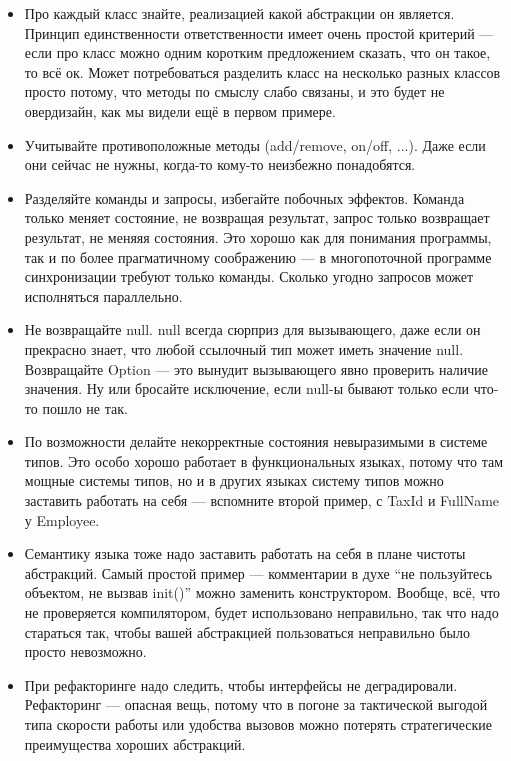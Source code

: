 \documentclass[a5paper]{article}
\begin{document}
\begin{itemize}
	\item Про каждый класс знайте, реализацией какой абстракции он является. Принцип единственности ответственности имеет очень простой критерий --- если про класс можно одним коротким предложением сказать, что он такое, то всё ок. Может потребоваться разделить класс на несколько разных классов просто потому, что методы по смыслу слабо связаны, и это будет не овердизайн, как мы видели ещё в первом примере.
	\item Учитывайте противоположные методы (add/remove, on/off, ...). Даже если они сейчас не нужны, когда-то кому-то неизбежно понадобятся.
	\item Разделяйте команды и запросы, избегайте побочных эффектов. Команда только меняет состояние, не возвращая результат, запрос только возвращает результат, не меняяя состояния. Это хорошо как для понимания программы, так и по более прагматичному соображению --- в многопоточной программе синхронизации требуют только команды. Сколько угодно запросов может исполняться параллельно.
	\item Не возвращайте null. null всегда сюрприз для вызывающего, даже если он прекрасно знает, что любой ссылочный тип может иметь значение null. Возвращайте Option --- это вынудит вызывающего явно проверить наличие значения. Ну или бросайте исключение, если null-ы бывают только если что-то пошло не так.
	\item По возможности делайте некорректные состояния невыразимыми в системе типов. Это особо хорошо работает в функциональных языках, потому что там мощные системы типов, но и в других языках систему типов можно заставить работать на себя --- вспомните второй пример, с TaxId и FullName у Employee.
	\item Семантику языка тоже надо заставить работать на себя в плане чистоты абстракций. Самый простой пример --- комментарии в духе ``не пользуйтесь объектом, не вызвав  init()'' можно заменить конструктором. Вообще, всё, что не проверяется компилятором, будет использовано неправильно, так что надо стараться так, чтобы вашей абстракцией пользоваться неправильно было просто невозможно.
	\item При рефакторинге надо следить, чтобы интерфейсы не деградировали. Рефакторинг --- опасная вещь, потому что в погоне за тактической выгодой типа скорости работы или удобства вызовов можно потерять стратегические преимущества хороших абстракций.
\end{itemize}
\end{document}
